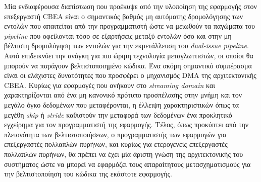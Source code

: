 Μία ενδιαφέρουσα διαπίστωση που προέκυψε από την υλοποίηση της εφαρμογής στον επεξεργαστή \ac{CBEA} είναι ο σημαντικός βαθμός μη αυτόματης δρομολόγησης των εντολών που απαιτείται από την προγραμματιστή ώστε να μειωθούν τα παγώματα του \textsl{pipeline} που οφείλονται τόσο σε εξαρτήσεις μεταξύ εντολών όσο και στην μη βέλτιστη δρομολόγηση των εντολών για την εκμετάλλευση του \textsl{dual-issue pipeline}. Αυτό επιδεικνύει την ανάγκη για πιο ώριμη τεχνολογία μεταγλωττιστών, οι οποίοι θα μπορούν να παράγουν βελτιστοποιημένο κώδικα.\newline \indent 
Ένα ακόμη σημαντικό συμπέρασμα είναι οι ελάχιστες δυνατότητες που προσφέρει ο μηχανισμός \ac{DMA} της αρχιτεκτονικής \ac{CBEA}. Κυρίως για εφαρμογές που ανήκουν στο \textsl{streaming domain} και χαρακτηρίζονται από ένα μη κανονικό πρότυπο προσπέλασης στην μνήμη και τον μεγάλο όγκο δεδομένων που μεταφέρονται, η έλλειψη χαρακτηριστικών όπως τα μεγέθη \textsl{skip} ή \textsl{stride} καθιστούν την μεταφορά των δεδομένων ένα προκλητικό εγχείρημα για τον προγραμματιστή της εφαρμογής.\newline \indent 
Τέλος, όπως προκύπτει από την πλειονότητα των βελτιστοποιήσεων, ο προγραμματιστής των εφαρμογών για επεξεργαστές πολλαπλών πυρήνων, και κυρίως για ετερογενείς επεξεργαστές πολλαπλών πυρήνων, θα πρέπει να έχει μία άριστη γνώση της αρχιτεκτονικής του συστήματος ώστε να μπορεί να εφαρμόζει τους απαραίτητους μετασχηματισμούς για την βελτιστοποίηση του κώδικα της εκάστοτε εφαρμογής. 